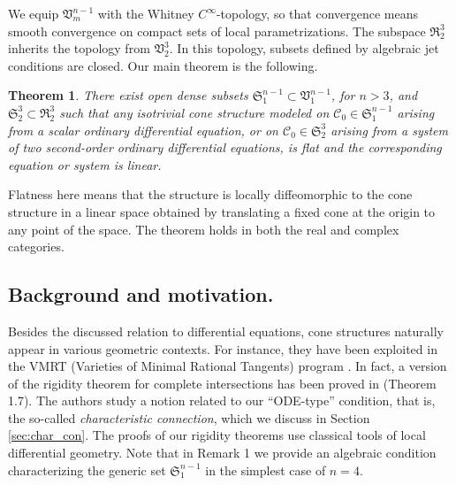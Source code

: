 \documentclass[11pt]{amsart}
\newtheorem{theorem}{Theorem}[section]
\theoremstyle{definition}
\newcommand{\CC}{\mathcal{C}}
\newcommand{\Set}{\mathfrak{S}}
\begin{document}
We equip $\mathfrak{V}_m^{n-1}$ with the Whitney $C^\infty$-topology, so that convergence means smooth convergence on compact sets of local parametrizations. The subspace $\mathfrak{R}_2^3$ inherits the topology from $\mathfrak{V}^3_2$. In this topology, subsets defined by algebraic jet conditions are closed. Our main theorem is the following.
\begin{theorem}\label{thm:main}
There exist open dense subsets $\Set_1^{n-1} \subset \mathfrak{V}^{n-1}_1$, for $n>3$, and $\Set_2^3 \subset \mathfrak{R}^3_2$ such that any isotrivial cone structure modeled on $\CC_0 \in \Set_1^{n-1}$ arising from a scalar ordinary differential equation, or on $\CC_0 \in \Set_2^3$ arising from a system of two second-order ordinary differential equations, is flat and the corresponding equation or system is linear.
\end{theorem}
Flatness here means that the structure is locally diffeomorphic to the cone structure in a linear space obtained by translating a fixed cone at the origin to any point of the space. The theorem holds in both the real and complex categories. 

\subsection{Background and motivation.} Besides the discussed relation to differential equations, cone structures naturally appear in various geometric contexts. For instance, they have been exploited in the VMRT (Varieties of Minimal Rational Tangents) program \cite{HM,H1,H2}. In fact, a version of the rigidity theorem for complete intersections has been proved in \cite{FH} (Theorem 1.7). The authors study a notion related to our ``ODE-type'' condition, that is, the so-called \emph{characteristic connection}, which we discuss in Section \ref{sec:char_con}. The proofs of our rigidity theorems use classical tools of local differential geometry. Note that in Remark 1 we provide an algebraic condition characterizing the generic set $\Set_1^{n-1}$ in the simplest case of $n=4$.
\end{document}
